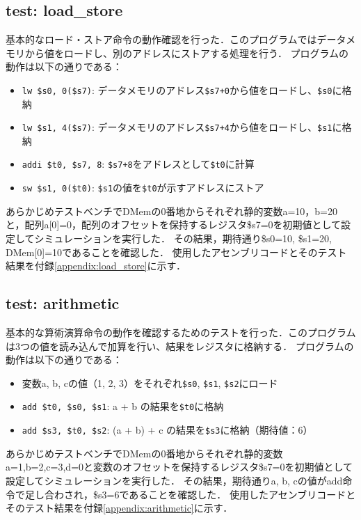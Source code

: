 \documentclass[dvipdfmx]{jsarticle}
\begin{document}
\subsection{test: load\_store}
基本的なロード・ストア命令の動作確認を行った．このプログラムではデータメモリから値をロードし、別のアドレスにストアする処理を行う．
プログラムの動作は以下の通りである：
\begin{itemize}
\item \texttt{lw \$s0, 0(\$s7)}: データメモリのアドレス\texttt{\$s7+0}から値をロードし、\texttt{\$s0}に格納
\item \texttt{lw \$s1, 4(\$s7)}: データメモリのアドレス\texttt{\$s7+4}から値をロードし、\texttt{\$s1}に格納  
\item \texttt{addi \$t0, \$s7, 8}: \texttt{\$s7+8}をアドレスとして\texttt{\$t0}に計算
\item \texttt{sw \$s1, 0(\$t0)}: \texttt{\$s1}の値を\texttt{\$t0}が示すアドレスにストア
\end{itemize}
あらかじめテストベンチでDMemの0番地からそれぞれ静的変数a=10，b=20と，配列a[0]=0，配列のオフセットを保持するレジスタ\$s7=0を初期値として設定してシミュレーションを実行した．
その結果，期待通り\$s0=10, \$s1=20, DMem[0]=10であることを確認した．
使用したアセンブリコードとそのテスト結果を付録\ref{appendix:load_store}に示す．

\subsection{test: arithmetic}
基本的な算術演算命令の動作を確認するためのテストを行った．このプログラムは3つの値を読み込んで加算を行い、結果をレジスタに格納する．
プログラムの動作は以下の通りである：
\begin{itemize}
\item 変数a, b, cの値（1, 2, 3）をそれぞれ\texttt{\$s0}, \texttt{\$s1}, \texttt{\$s2}にロード
\item \texttt{add \$t0, \$s0, \$s1}: a + b の結果を\texttt{\$t0}に格納
\item \texttt{add \$s3, \$t0, \$s2}: (a + b) + c の結果を\texttt{\$s3}に格納（期待値：6）
\end{itemize}
あらかじめテストベンチでDMemの0番地からそれぞれ静的変数a=1,b=2,c=3,d=0と変数のオフセットを保持するレジスタ\$s7=0を初期値として設定してシミュレーションを実行した．
その結果，期待通りa, b, cの値がadd命令で足し合わされ，\$s3=6であることを確認した．
使用したアセンブリコードとそのテスト結果を付録\ref{appendix:arithmetic}に示す．
\end{document}
